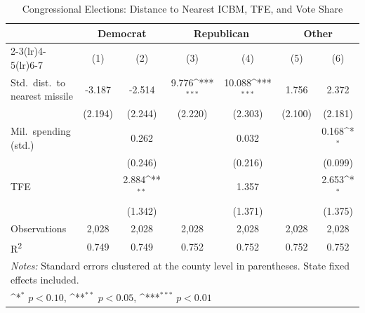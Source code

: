 \begin{table}[htbp]\centering
\setlength{\tabcolsep}{5pt}
\small
\def\sym#1{\ifmmode^{#1}\else\(^{#1}\)\fi}
\caption{Congressional Elections: Distance to Nearest ICBM, TFE, and Vote Share}
\begin{tabular}{l*{6}{c}}
\toprule
                    &\multicolumn{2}{c}{Democrat}&\multicolumn{2}{c}{Republican}&\multicolumn{2}{c}{Other}\\
\cmidrule(lr){2-3}\cmidrule(lr){4-5}\cmidrule(lr){6-7}
                    &\multicolumn{1}{c}{(1)}&\multicolumn{1}{c}{(2)}&\multicolumn{1}{c}{(3)}&\multicolumn{1}{c}{(4)}&\multicolumn{1}{c}{(5)}&\multicolumn{1}{c}{(6)}\\
\midrule
Std.\ dist.\ to nearest missile
                    &      -3.187         &      -2.514         &       9.776\sym{***}&      10.088\sym{***}&       1.756         &       2.372         \\
                    &     (2.194)         &     (2.244)         &     (2.220)         &     (2.303)         &     (2.100)         &     (2.181)         \\
Mil.\ spending (std.)
                    &                     &       0.262         &                     &       0.032         &                     &       0.168\sym{*}  \\
                    &                     &     (0.246)         &                     &     (0.216)         &                     &     (0.099)         \\
TFE                 &                     &       2.884\sym{**} &                     &       1.357         &                     &       2.653\sym{*}  \\
                    &                     &     (1.342)         &                     &     (1.371)         &                     &     (1.375)         \\
\midrule
Observations        &       2,028         &       2,028         &       2,028         &       2,028         &       2,028         &       2,028         \\
R\textsuperscript{2}&       0.749         &       0.749         &       0.752         &       0.752         &       0.752         &       0.752         \\
\bottomrule
\multicolumn{7}{l}{\footnotesize \textit{Notes:} Standard errors clustered at the county level in parentheses. State fixed effects included.}\\
\multicolumn{7}{l}{\footnotesize \sym{*} \(p<0.10\), \sym{**} \(p<0.05\), \sym{***} \(p<0.01\)}\\
\end{tabular}
\end{table}
